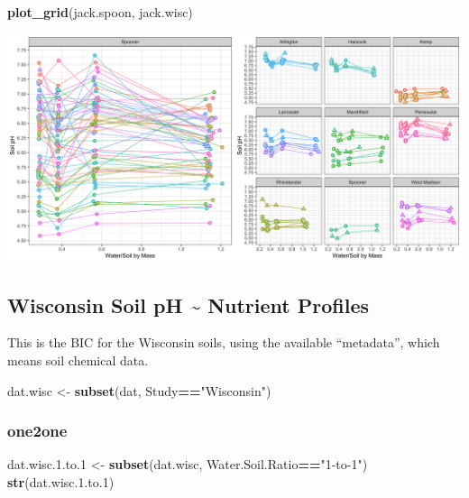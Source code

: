 \documentclass[]{article}
\newenvironment{Shaded}{\begin{snugshade}}{\end{snugshade}}
\newcommand{\FloatTok}[1]{\textcolor[rgb]{0.00,0.00,0.81}{#1}}
\newcommand{\KeywordTok}[1]{\textcolor[rgb]{0.13,0.29,0.53}{\textbf{#1}}}
\newcommand{\NormalTok}[1]{#1}
\newcommand{\OperatorTok}[1]{\textcolor[rgb]{0.81,0.36,0.00}{\textbf{#1}}}
\newcommand{\StringTok}[1]{\textcolor[rgb]{0.31,0.60,0.02}{#1}}
\begin{document}
\begin{Shaded}
\begin{Highlighting}[]
\KeywordTok{plot_grid}\NormalTok{(jack.spoon, jack.wisc)}
\end{Highlighting}
\end{Shaded}

\includegraphics{output-rmd/jackson-plot-wiscons-spooner-1.png}

\hypertarget{wisconsin-soil-ph-nutrient-profiles}{%
\subsection{Wisconsin Soil pH \textasciitilde{} Nutrient
Profiles}\label{wisconsin-soil-ph-nutrient-profiles}}

This is the BIC for the Wisconsin soils, using the available
``metadata'', which means soil chemical data.

\begin{Shaded}
\begin{Highlighting}[]
\NormalTok{dat.wisc <-}\StringTok{ }\KeywordTok{subset}\NormalTok{(dat, Study}\OperatorTok{==}\StringTok{"Wisconsin"}\NormalTok{)}
\end{Highlighting}
\end{Shaded}

\hypertarget{one2one}{%
\subsubsection{one2one}\label{one2one}}

\begin{Shaded}
\begin{Highlighting}[]
\NormalTok{dat.wisc.}\FloatTok{1.}\NormalTok{to}\FloatTok{.1}\NormalTok{ <-}\StringTok{ }\KeywordTok{subset}\NormalTok{(dat.wisc, Water.Soil.Ratio}\OperatorTok{==}\StringTok{"1-to-1"}\NormalTok{)}
\KeywordTok{str}\NormalTok{(dat.wisc.}\FloatTok{1.}\NormalTok{to}\FloatTok{.1}\NormalTok{)}
\end{Highlighting}
\end{Shaded}
\end{document}
